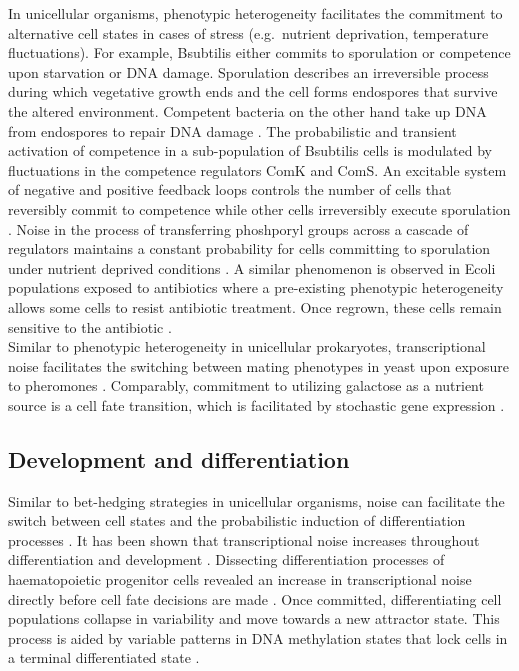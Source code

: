 In unicellular organisms, phenotypic heterogeneity facilitates the commitment to alternative cell states in cases of stress (e.g.~nutrient deprivation, temperature fluctuations). For example, \Gls{Bsubtilis} either commits to sporulation or competence upon starvation or DNA damage. Sporulation describes an irreversible process during which vegetative growth ends and the cell forms endospores that survive the altered environment. Competent bacteria on the other hand take up DNA from endospores to repair DNA damage \citep{Schultz2009}. The probabilistic and transient activation of competence in a sub-population of \Gls{Bsubtilis} cells is modulated by fluctuations in the competence regulators ComK and ComS. An excitable system of negative and positive feedback loops controls the number of cells that reversibly commit to competence while other cells irreversibly execute sporulation \citep{Suel2006}. Noise in the process of transferring phoshporyl groups across a cascade of regulators maintains a constant probability for cells committing to sporulation under nutrient deprived conditions \citep{Russell2017}. A similar phenomenon is observed in \Gls{Ecoli} populations exposed to antibiotics where a pre-existing phenotypic heterogeneity allows some cells to resist antibiotic treatment. Once regrown, these cells remain sensitive to the antibiotic \citep{Balaban2004}. \\

Similar to phenotypic heterogeneity in unicellular prokaryotes, transcriptional noise facilitates the switching between mating phenotypes in yeast upon exposure to pheromones \citep{Paliwal2007}. Comparably, commitment to utilizing galactose as a nutrient source is a cell fate transition, which is facilitated by stochastic gene expression \cite{Acar2008}. 

\subsection{Development and differentiation}

Similar to bet-hedging strategies in unicellular organisms, noise can facilitate the switch between cell states and the probabilistic induction of differentiation processes \citep{Eldar2010, Chang2008}. It has been shown that transcriptional noise increases throughout differentiation \citep{Stumpf2017} and development \citep{Antolovic2017}. Dissecting differentiation processes of haematopoietic progenitor cells revealed an increase in transcriptional noise directly before cell fate decisions are made \citep{Mojtahedi2016, Richard2016}. Once committed, differentiating cell populations collapse in variability and move towards a new attractor state. This process is aided by variable patterns in DNA methylation states that lock cells in a terminal differentiated state \citep{Jenkinson2017}. \\

